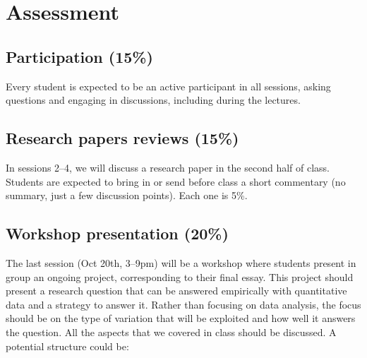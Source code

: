 \documentclass[12pt, a4paper]{article}
\begin{document}

\section{Assessment}


\subsection*{Participation (15\%)}

Every student is expected to be an active participant in all sessions, asking questions and engaging in discussions, including during the lectures.

\subsection*{Research papers reviews (15\%)}

In sessions 2--4, we will discuss a research paper in the second half of class. Students are expected to bring in or send before class a short commentary (no summary, just a few discussion points). Each one is 5\%.

\subsection*{Workshop presentation (20\%)}

The last session (Oct 20th, 3--9pm) will be a workshop where students present in group an ongoing project, corresponding to their final essay. This project should present a research question that can be answered empirically with quantitative data and a strategy to answer it. Rather than focusing on data analysis, the focus should be on the type of variation that will be exploited and how well it answers the question. All the aspects that we covered in class should be discussed. A potential structure could be:
\end{document}
